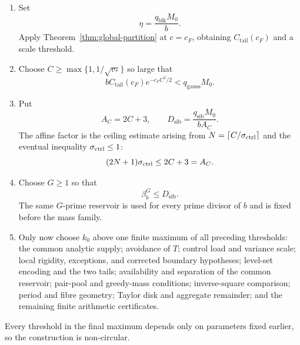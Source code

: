 \begin{enumerate}[label=\textbf{\arabic*.}]
\item Set
\begin{equation}\label{eq:eta-choice}
 \eta=\frac{q_{\mathrm{blk}}M_0}{b}.
\end{equation}
Apply Theorem~\ref{thm:global-partition} at $c=c_F$, obtaining
$C_{\mathrm{tail}}(c_F)$ and a scale threshold.

\item Choose $C\ge\max\{1,1/\sqrt{v_*}\}$ so large that
\begin{equation}\label{eq:gaussian-budget}
 bC_{\mathrm{tail}}(c_F)e^{-c_FC^2/2}
 <q_{\mathrm{gauss}}M_0.
\end{equation}

\item Put
\begin{equation}\label{eq:AC-Dsib}
 A_C=2C+3,
 \qquad
 D_{\mathrm{sib}}=
 \frac{q_{\mathrm{sib}}M_0}{bA_C}.
\end{equation}
The affine factor is the ceiling estimate arising from
$N=\lceil C/\sigma_{\mathrm{ctrl}}\rceil$ and the eventual inequality $\sigma_{\mathrm{ctrl}}\le1$:
\begin{equation}\label{eq:N-bound}
 (2N+1)\sigma_{\mathrm{ctrl}}\le2C+3=A_C.
\end{equation}

\item Choose $G\ge1$ so that
\begin{equation}\label{eq:G-choice}
 \beta_b^G\le D_{\mathrm{sib}}.
\end{equation}
The same $G$-prime reservoir is used for every prime divisor of $b$ and is
fixed before the mass family.

\item Only now choose $k_0$ above one finite maximum of all preceding
thresholds: the common analytic supply; avoidance of $T$; control load and
variance scale; local rigidity, exceptions, and corrected boundary hypotheses;
level-set encoding and the two tails; availability and separation of the common
reservoir; pair-pool and greedy-mass conditions; inverse-square comparison;
period and fibre geometry; Taylor disk and aggregate remainder; and the
remaining finite arithmetic certificates.
\end{enumerate}
Every threshold in the final maximum depends only on parameters fixed earlier,
so the construction is non-circular.

